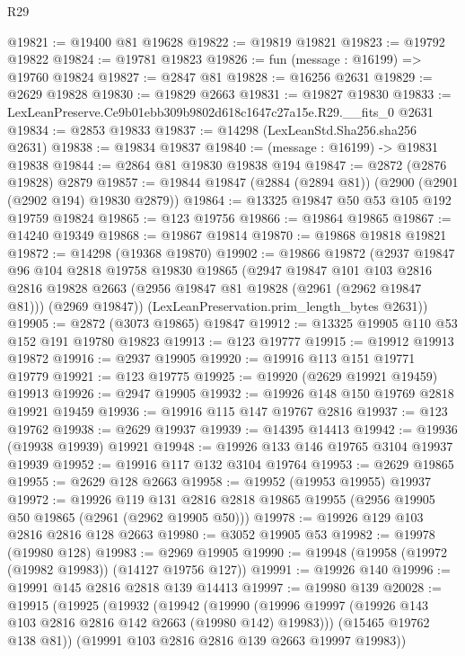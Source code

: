 \begin{lexlean}{R29}
\begin{coremodule}
@19821 := @19400 @81 @19628
@19822 := @19819 @19821
@19823 := @19792 @19822
@19824 := @19781 @19823
@19826 := fun (message : @16199) => @19760 @19824
@19827 := @2847 @81
@19828 := @16256 @2631
@19829 := @2629 @19828
@19830 := @19829 @2663
@19831 := @19827 @19830
@19833 := LexLeanPreserve.Ce9b01ebb309b9802d618c1647c27a15e.R29.__fits_0 @2631
@19834 := @2853 @19833
@19837 := @14298 (LexLeanStd.Sha256.sha256 @2631)
@19838 := @19834 @19837
@19840 := (message : @16199) -> @19831 @19838
@19844 := @2864 @81 @19830 @19838 @194
@19847 := @2872 (@2876 @19828) @2879
@19857 := @19844 @19847 (@2884 (@2894 @81)) (@2900 (@2901 (@2902 @194) @19830 @2879))
@19864 := @13325 @19847 @50 @53 @105 @192 @19759 @19824
@19865 := @123 @19756
@19866 := @19864 @19865
@19867 := @14240 @19349
@19868 := @19867 @19814
@19870 := @19868 @19818 @19821
@19872 := @14298 (@19368 @19870)
@19902 := @19866
    @19872
    (@2937
      @19847
      @96
      @104
      @2818
      @19758
      @19830
      @19865
      (@2947
        @19847
        @101
        @103
        @2816
        @2816
        @19828
        @2663
        (@2956 @19847 @81 @19828 (@2961 (@2962 @19847 @81)))
        (@2969 @19847))
      (LexLeanPreservation.prim_length_bytes @2631))
@19905 := @2872 (@3073 @19865) @19847
@19912 := @13325 @19905 @110 @53 @152 @191 @19780 @19823
@19913 := @123 @19777
@19915 := @19912 @19913 @19872
@19916 := @2937 @19905
@19920 := @19916 @113 @151 @19771 @19779
@19921 := @123 @19775
@19925 := @19920 (@2629 @19921 @19459) @19913
@19926 := @2947 @19905
@19932 := @19926 @148 @150 @19769 @2818 @19921 @19459
@19936 := @19916 @115 @147 @19767 @2816
@19937 := @123 @19762
@19938 := @2629 @19937
@19939 := @14395 @14413
@19942 := @19936 (@19938 @19939) @19921
@19948 := @19926 @133 @146 @19765 @3104 @19937 @19939
@19952 := @19916 @117 @132 @3104 @19764
@19953 := @2629 @19865
@19955 := @2629 @128 @2663
@19958 := @19952 (@19953 @19955) @19937
@19972 := @19926
    @119
    @131
    @2816
    @2818
    @19865
    @19955
    (@2956 @19905 @50 @19865 (@2961 (@2962 @19905 @50)))
@19978 := @19926 @129 @103 @2816 @2816 @128 @2663
@19980 := @3052 @19905 @53
@19982 := @19978 (@19980 @128)
@19983 := @2969 @19905
@19990 := @19948 (@19958 (@19972 (@19982 @19983)) (@14127 @19756 @127))
@19991 := @19926 @140
@19996 := @19991 @145 @2816 @2818 @139 @14413
@19997 := @19980 @139
@20028 := @19915
    (@19925
      (@19932
        (@19942
          (@19990 (@19996 @19997 (@19926 @143 @103 @2816 @2816 @142 @2663 (@19980 @142) @19983)))
          (@15465 @19762 @138 @81))
        (@19991 @103 @2816 @2816 @139 @2663 @19997 @19983))

\end{coremodule}
\end{lexlean}
